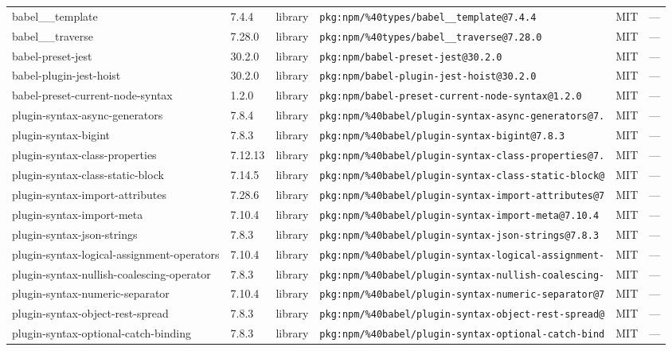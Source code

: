 \documentclass[11pt]{article}
\begin{document}
\begin{longtable}{|l|l|l|p{2.2cm}|l|p{4cm}|}
babel\_\_template & 7.4.4 & library & \texttt{pkg:npm/\%40types/babel\_\_template@7.4.4} & MIT & — \\
babel\_\_traverse & 7.28.0 & library & \texttt{pkg:npm/\%40types/babel\_\_traverse@7.28.0} & MIT & — \\
babel-preset-jest & 30.2.0 & library & \texttt{pkg:npm/babel-preset-jest@30.2.0} & MIT & — \\
babel-plugin-jest-hoist & 30.2.0 & library & \texttt{pkg:npm/babel-plugin-jest-hoist@30.2.0} & MIT & — \\
babel-preset-current-node-syntax & 1.2.0 & library & \texttt{pkg:npm/babel-preset-current-node-syntax@1.2.0} & MIT & — \\
plugin-syntax-async-generators & 7.8.4 & library & \texttt{pkg:npm/\%40babel/plugin-syntax-async-generators@7.} & MIT & — \\
plugin-syntax-bigint & 7.8.3 & library & \texttt{pkg:npm/\%40babel/plugin-syntax-bigint@7.8.3} & MIT & — \\
plugin-syntax-class-properties & 7.12.13 & library & \texttt{pkg:npm/\%40babel/plugin-syntax-class-properties@7.} & MIT & — \\
plugin-syntax-class-static-block & 7.14.5 & library & \texttt{pkg:npm/\%40babel/plugin-syntax-class-static-block@} & MIT & — \\
plugin-syntax-import-attributes & 7.28.6 & library & \texttt{pkg:npm/\%40babel/plugin-syntax-import-attributes@7} & MIT & — \\
plugin-syntax-import-meta & 7.10.4 & library & \texttt{pkg:npm/\%40babel/plugin-syntax-import-meta@7.10.4} & MIT & — \\
plugin-syntax-json-strings & 7.8.3 & library & \texttt{pkg:npm/\%40babel/plugin-syntax-json-strings@7.8.3} & MIT & — \\
plugin-syntax-logical-assignment-operators & 7.10.4 & library & \texttt{pkg:npm/\%40babel/plugin-syntax-logical-assignment-} & MIT & — \\
plugin-syntax-nullish-coalescing-operator & 7.8.3 & library & \texttt{pkg:npm/\%40babel/plugin-syntax-nullish-coalescing-} & MIT & — \\
plugin-syntax-numeric-separator & 7.10.4 & library & \texttt{pkg:npm/\%40babel/plugin-syntax-numeric-separator@7} & MIT & — \\
plugin-syntax-object-rest-spread & 7.8.3 & library & \texttt{pkg:npm/\%40babel/plugin-syntax-object-rest-spread@} & MIT & — \\
plugin-syntax-optional-catch-binding & 7.8.3 & library & \texttt{pkg:npm/\%40babel/plugin-syntax-optional-catch-bind} & MIT & — \\

\end{longtable}
\end{document}
